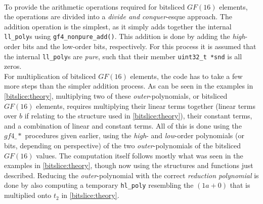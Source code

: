 \medskip\\
To provide the arithmetic operations required for bitsliced $GF(16)$ elements, the operations are divided into a \emph{divide and conquer}-esque approach. The addition operation is the simplest, as it simply adds together the internal \texttt{ll\_poly}s using \texttt{gf4\_nonpure\_add()}. This addition is done by adding the \emph{high}-order bits and the low-order bits, respectively. For this process it is assumed that the internal \texttt{ll\_poly}s are \emph{pure}, such that their member \texttt{uint32\_t *snd} is all zeros.
\medskip\\
For multiplication of bitsliced $GF(16)$ elements, the code has to take a few more steps than the simpler addition process. As can be seen in the examples in \cref{bitslice:theory}, multiplying two of these \emph{outer}-polynomials, or bitsliced $GF(16)$ elements, requires multiplying their linear terms together (linear terms over $b$ if relating to the structure used in \cref{bitslice:theory}), their constant terms, and a combination of linear and constant terms. All of this is done using the $gf4\_*$ procedures given earlier, using the \emph{high}- and \emph{low}-order polynomials (or bits, depending on perspective) of the two \emph{outer}-polynomials of the bitsliced $GF(16)$ values. The computation itself follows mostly what was seen in the examples in \cref{bitslice:theory}, though now using the structures and functions just described. Reducing the \emph{outer}-polynomial with the correct \emph{reduction polynomial} is done by also computing a temporary \texttt{hl\_poly} resembling the $(1a+0)$ that is multiplied onto $t_2$ in \cref{bitslice:theory}.
